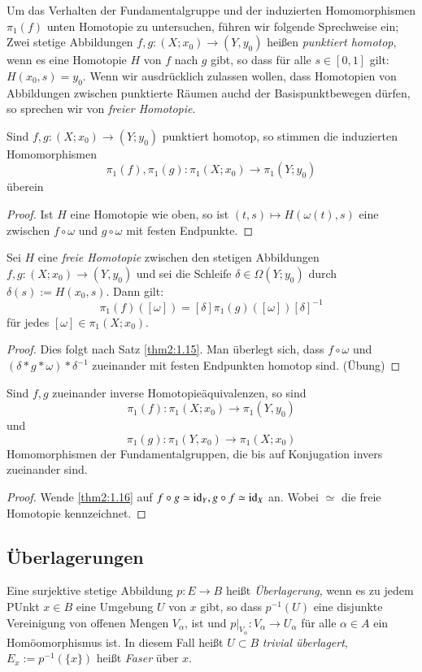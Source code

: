 \documentclass[a4paper,10pt]{scrartcl}
\begin{document}
Um das Verhalten der Fundamentalgruppe und der induzierten Homomorphismen $\pi_1(f)$ unten Homotopie zu untersuchen, führen wir folgende Sprechweise ein; Zwei stetige Abbildungen $f,g: (X;x_0)\to (Y,y_0)$ heißen \emph{punktiert homotop}, wenn es eine Homotopie $H$ von $f$ nach $g$ gibt, so dass für alle $s\in [0,1]$ gilt: $H(x_0, s)=y_0$. Wenn wir ausdrücklich zulassen wollen, dass Homotopien von Abbildungen zwischen punktierte Räumen auchd der Basispunktbewegen dürfen, so sprechen wir von \emph{freier Homotopie}.

\begin{st}
 Sind $f,g: (X;x_0)\to (Y;y_0)$ punktiert homotop, so stimmen die induzierten Homomorphismen
\[
 \pi_1(f), \pi_1(g): \pi_1(X;x_0)\to \pi_1(Y;y_0)
\]
überein
\end{st}
\begin{proof}
 Ist $H$ eine Homotopie wie oben, so ist $(t,s)\mapsto H(\omega(t), s)$ eine zwischen $f\circ \omega$ und $g\circ \omega$ mit festen Endpunkte.
\end{proof}

\begin{st}
 Sei $H$ eine \emph{freie Homotopie} zwischen den stetigen Abbildungen $f,g: (X;x_0)\to (Y,y_0)$ und sei die Schleife $\delta\in \Omega(Y;y_0)$ durch $\delta(s):=H(x_0, s)$. Dann gilt:
\[
 \pi_1(f)([\omega])=[\delta]\pi_1(g)([\omega]){[\delta]}^{-1}
\]
für jedes $[\omega]\in \pi_1(X;x_0)$.
\end{st}

\begin{proof}
 Dies folgt nach Satz \ref{thm2:1.15}. Man überlegt sich, dass $f\circ \omega$ und $(\delta*g*\omega)*\delta^{-1}$ zueinander mit festen Endpunkten homotop sind. (Übung)
\end{proof}
\begin{kor}
 Sind $f,g$ zueinander inverse Homotopieäquivalenzen, so sind
\[
\pi_1(f):\pi_1(X;x_0)\to \pi_1(Y,y_0)
\]
und
\[
 \pi_1(g):\pi_1(Y,x_0)\to \pi_1(X;x_0)
\]
Homomorphismen der Fundamentalgruppen, die bis auf Konjugation invers zueinander sind. 
\end{kor}
\begin{proof}
 Wende \ref{thm2:1.16} auf $f\circ g \simeq \operatorname{id}_Y, g\circ f \simeq \operatorname{id}_X$ an.  Wobei $\simeq$ die freie Homotopie kennzeichnet.
\end{proof}
\subsection{Überlagerungen}
\begin{df}
 Eine surjektive stetige Abbildung $p: E\to B$ heißt \emph{Überlagerung}, wenn es zu jedem PUnkt $x\in B$ eine Umgebung $U$ von $x$ gibt, so dass $p^{-1}(U)$ eine disjunkte Vereinigung von offenen Mengen $V_\alpha$, ist und $p|_{V_\alpha}: V_\alpha\to U_\alpha$ für alle $\alpha\in A$ ein Homöomorphismus ist. In diesem Fall heißt $U\subset B$ \emph{trivial überlagert}, $E_x:=p^{-1}(\{x\})$ heißt \emph{Faser} über $x$.
\fixme[fig68]\\
\fixme[fig69]
\end{df}
\end{document}
